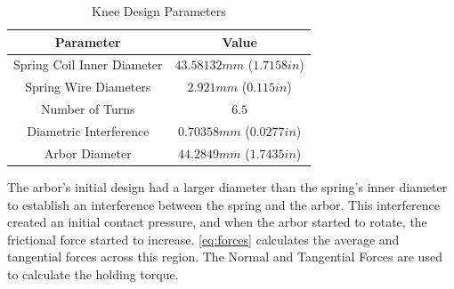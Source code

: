\begin{table}[h!]
\centering
 \begin{tabular}{|c || c|} 
 \hline
 Parameter & Value  \\ [0.5ex] 
 \hline\hline
 Spring Coil Inner Diameter   & $43.58132mm$ ($1.7158in$)   \\
\hline
Spring Wire Diameters &   $2.921mm$  ($0.115in$)  \\
\hline
Number of Turns     &   $6.5$ \\
\hline
Diametric Interference    &   $0.70358mm$ ($0.0277in$) \\
 \hline
  Arbor Diameter &  $44.2849mm$ ($1.7435 in$) \\ [1ex]
 \hline
 \end{tabular}
\caption[Knee Parameters]{Knee Design Parameters}
\label{tab:KneeDesign}
\end{table}






The arbor's initial design had a larger diameter than the spring's inner diameter to establish an interference between the spring and the arbor. This interference created an initial contact pressure, and when the arbor started to rotate, the frictional force started to increase. \autoref{eq:forces}  calculates the average and tangential forces across this region. The Normal and Tangential Forces are used to calculate the holding torque.

